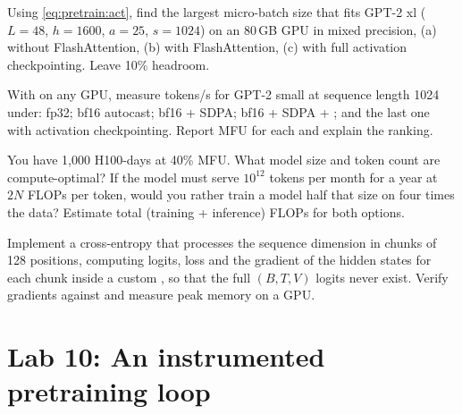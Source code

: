 \begin{exercise}
Using \cref{eq:pretrain:act}, find the largest micro-batch size that fits GPT-2 xl
($L=48$, $h=1600$, $a=25$, $s=1024$) on an 80\,GB GPU in mixed precision, (a) without
FlashAttention, (b) with FlashAttention, (c) with full activation checkpointing. Leave 10\%
headroom.
\end{exercise}

\begin{exercise}
With  on any GPU, measure tokens/s for GPT-2 small at sequence length 1024
under: fp32; bf16 autocast; bf16 + SDPA; bf16 + SDPA + ; and the last one
with activation checkpointing. Report MFU for each and explain the ranking.
\end{exercise}

\begin{exercise}
You have 1{,}000 H100-days at 40\% MFU. What model size and token count are compute-optimal?
If the model must serve $10^{12}$ tokens per month for a year at $2N$ FLOPs per token, would you
rather train a model half that size on four times the data? Estimate total (training +
inference) FLOPs for both options.
\end{exercise}

\begin{exercise}\label{ex:pretrain:chunked}
Implement a cross-entropy that processes the sequence dimension in chunks of 128 positions,
computing logits, loss and the gradient of the hidden states for each chunk inside a custom
, so that the full $(B,T,V)$ logits never exist. Verify gradients
against  and measure peak memory on a GPU.
\end{exercise}

\section{Lab 10: An instrumented pretraining loop}\label{sec:pretrain:lab}

